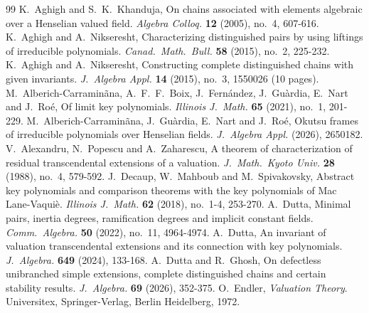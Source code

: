 \documentclass[11pt]{amsart}
\theoremstyle{definition}
\theoremstyle{remark}
\numberwithin{equation}{section}
\begin{document}
	\begin{thebibliography}{99}
			 K.\ Aghigh and S.\  K.\  Khanduja,  On chains associated with elements algebraic over a Henselian valued field. {\it Algebra Colloq.} {\bf 12} (2005), no.\ 4, 607-616.
			 K.\ Aghigh and A.\  Nikseresht,  Characterizing distinguished pairs by using liftings of irreducible polynomials. {\it Canad.\  Math.\  Bull.} {\bf 58} (2015), no.\ 2, 225-232.
			 K.\ Aghigh and A.\ Nikseresht,   Constructing complete distinguished chains with given invariants.  {\it J.\  Algebra Appl.} {\bf 14} (2015), no.\ 3, 1550026 (10 pages).
			  M.\ Alberich-Carramin\~ ana, A.\ F.\ F.\  Boix, J.\ Fern\'andez, J.\ Gu\`ardia, E.\ Nart and J.\  Ro\'e,  Of limit key polynomials.  {\it Illinois J.\  Math.} {\bf 65} (2021), no.\ 1, 201-229.
			  M.\ Alberich-Carramin\~ ana, J.\ Gu\`ardia, E.\ Nart and J.\  Ro\'e, Okutsu frames of irreducible polynomials over Henselian fields.  {\it J.\ Algebra Appl.} (2026), 2650182. 
			 V.\  Alexandru,  N.\ Popescu and  A.\ Zaharescu,   A theorem of characterization of residual transcendental extensions of a valuation. {\it J.\  Math.\  Kyoto Univ.}  {\bf 28} (1988), no.\ 4, 579-592.
		 J.\ Decaup, W.\ Mahboub and M.\ Spivakovsky, Abstract key polynomials and comparison theorems with the key polynomials of Mac Lane-Vaqui\`e. {\it Illinois J.\ Math.} {\bf 62} (2018), no.\ 1-4, 253-270.
		 A.\ Dutta, Minimal pairs, inertia degrees, ramification degrees and implicit constant fields. {\it Comm.\ Algebra.} {\bf 50} (2022), no.\ 11, 4964-4974.
			 A.\ Dutta, An invariant of valuation transcendental extensions and its connection with key polynomials. {\it J.\ Algebra.} {\bf 649} (2024), 133-168.
			 A.\ Dutta and R.\ Ghosh, On defectless unibranched simple extensions, complete distinguished chains and certain stability results. {\it J.\ Algebra.} {\bf 69} (2026), 352-375.
			 O.\ Endler, {\it Valuation Theory}. Universitex, Springer-Verlag, Berlin Heidelberg, 1972. 

\end{thebibliography}
\end{document}
